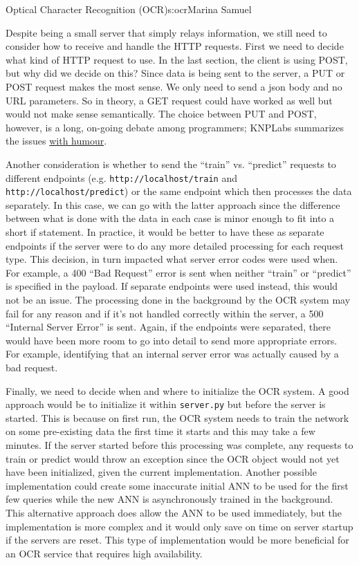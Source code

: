 \begin{aosachapter}{Optical Character Recognition (OCR)}{s:ocr}{Marina Samuel}
\label{a-server-server.py}

Despite being a small server that simply relays information, we still
need to consider how to receive and handle the HTTP requests. First we
need to decide what kind of HTTP request to use. In the last section,
the client is using POST, but why did we decide on this? Since data is
being sent to the server, a PUT or POST request makes the most sense. We
only need to send a json body and no URL parameters. So in theory, a GET
request could have worked as well but would not make sense semantically.
The choice between PUT and POST, however, is a long, on-going debate
among programmers; KNPLabs summarizes the issues
\href{https://knpuniversity.com/screencast/rest/put-versus-post}{with
humour}.

Another consideration is whether to send the ``train'' vs. ``predict''
requests to different endpoints (e.g. \texttt{http://localhost/train}
and \texttt{http://localhost/predict}) or the same endpoint which then
processes the data separately. In this case, we can go with the latter
approach since the difference between what is done with the data in each
case is minor enough to fit into a short if statement. In practice, it
would be better to have these as separate endpoints if the server were
to do any more detailed processing for each request type. This decision,
in turn impacted what server error codes were used when. For example, a
400 ``Bad Request'' error is sent when neither ``train'' or ``predict''
is specified in the payload. If separate endpoints were used instead,
this would not be an issue. The processing done in the background by the
OCR system may fail for any reason and if it's not handled correctly
within the server, a 500 ``Internal Server Error'' is sent. Again, if
the endpoints were separated, there would have been more room to go into
detail to send more appropriate errors. For example, identifying that an
internal server error was actually caused by a bad request.

Finally, we need to decide when and where to initialize the OCR system.
A good approach would be to initialize it within \texttt{server.py} but
before the server is started. This is because on first run, the OCR
system needs to train the network on some pre-existing data the first
time it starts and this may take a few minutes. If the server started
before this processing was complete, any requests to train or predict
would throw an exception since the OCR object would not yet have been
initialized, given the current implementation. Another possible
implementation could create some inaccurate initial ANN to be used for
the first few queries while the new ANN is asynchronously trained in the
background. This alternative approach does allow the ANN to be used
immediately, but the implementation is more complex and it would only
save on time on server startup if the servers are reset. This type of
implementation would be more beneficial for an OCR service that requires
high availability.


\end{aosachapter}
